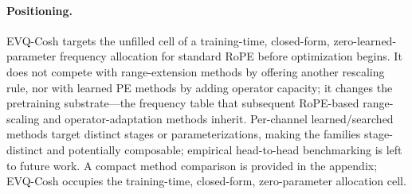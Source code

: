 \paragraph{Positioning.} EVQ-Cosh targets the unfilled cell of a training-time, closed-form, zero-learned-parameter frequency allocation for standard RoPE before optimization begins. It does not compete with range-extension methods by offering another rescaling rule, nor with learned PE methods by adding operator capacity; it changes the pretraining substrate---the frequency table that subsequent RoPE-based range-scaling and operator-adaptation methods inherit. Per-channel learned/searched methods \citep{shang2025longrope2, veisi2025carope, hua2025fope} target distinct stages or parameterizations, making the families stage-distinct and potentially composable; empirical head-to-head benchmarking is left to future work. A compact method comparison is provided in the appendix; EVQ-Cosh occupies the training-time, closed-form, zero-parameter allocation cell.
